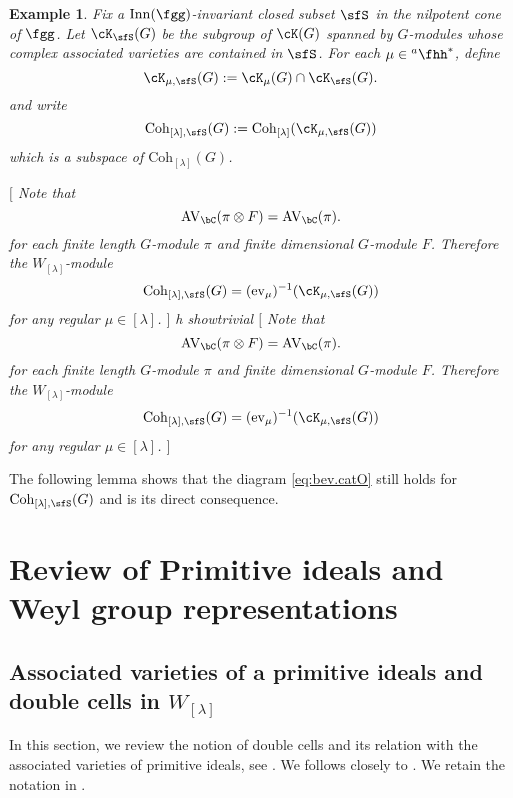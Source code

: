 \documentclass[12pt,a4paper]{amsart}
\newcommand{\trivial}[2][]{\if\relax\detokenize{#1}\relax
  {%
      \color{orange} \vspace{0em} $[$  #2 $]$
      \color{black}
  }
  \else
\ifx#1h
\ifcsname showtrivial\endcsname
{%
    \color{orange} \vspace{0em}  $[$ #2 $]$
    \color{black}
}
\fi
\else {\red Wrong argument!} \fi
\fi
}
\newcommand{\AVC}{\mathrm{AV}_\bC}
\numberwithin{equation}{section}
\newtheorem{eg}[thm]{Example}
\theoremstyle{remark}
\def\Irr{\mathrm{Irr}}
\def\hha{{}^a\fhh}
\def\ahh{\hha}
\def\WLam{W_{\Lam}}
\def\Coh{\mathrm{Coh}}
\def\ev#1{{\mathrm{ev}_{#1}}}
\def\Inn{\mathrm{Inn}}
\newcommand{\Lam}{{[\lambda]}}
\newcommand{\Grt}{\cK}
\begin{document}
\begin{eg}
  Fix a $\Inn(\fgg)$-invariant closed subset $\sfS$ in the nilpotent cone of
  $\fgg$. Let $\Grt_{\sfS}(G)$ be the subgroup of $\Grt(G)$ spanned by
  $G$-modules whose complex associated varieties are contained in $\sfS$. For
  each $\mu\in \ahh^{*}$, define
  \[
    \Grt_{\mu,\sfS}(G) := \Grt_{ \mu}(G)\cap \Grt_{\sfS}(G).
  \]
  and write
  \[
    \Coh_{[\lambda],\sfS}(G):= \Coh_{[\lambda]}(\Grt_{\mu,\sfS}(G))
  \]
  which is a subspace of $\Coh_{\Lam}(G)$.

  \trivial[]{ Note that
    \[
      \AVC(\pi\otimes F) = \AVC(\pi).
    \]
    for each finite length $G$-module $\pi$ and finite dimensional $G$-module
    $F$. Therefore the $W_{[\lambda]}$-module
    \[
      \Coh_{[\lambda],\sfS}(G) = (\ev{\mu})^{-1}(\Grt_{\mu,\sfS}(G))
    \]
    for any regular $\mu\in [\lambda]$. }
\end{eg}



The following lemma shows that the diagram \cref{eq:bev.catO} still holds for
$\Coh_{[\lambda],\sfS}(G)$ and  is its direct consequence.



\section{Review of Primitive ideals and Weyl group representations}

\subsection{Associated varieties of a primitive ideals and double cells in
  $\WLam$}
In this section, we review the notion of double cells and its relation with the
associated varieties of primitive ideals, see \cite{BV2,J.av}. We follows
closely to \cite{BV2}. We retain the notation in .
\end{document}
